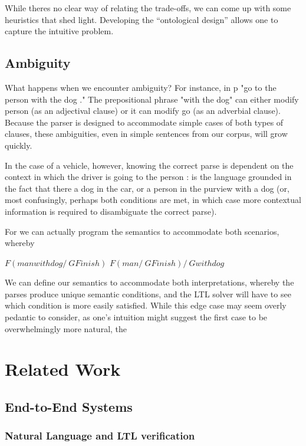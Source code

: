 \documentclass[a4paper, 11pt]{article}
\begin{document}
While theres no clear way of relating the trade-offs, we can come up with some
heuristics that shed light. Developing the ``ontological design'' allows one to
capture the intuitive problem.


\subsection{Ambiguity}

What happens when we encounter ambiguity? For instance, in p "go to the person
with the dog ." The prepositional phrase "with the dog" can either modify person
(as an adjectival clause) or it can modify go (as an adverbial clause). Because
the parser is designed to accommodate simple cases of both types of clauses,
these ambiguities, even in simple sentences from our corpus, will grow quickly. 

In the case of a vehicle, however, knowing the correct parse is dependent on
the context in which the driver is going to the person : is the language
grounded in the fact that there a dog in the car, or a person in the purview
with a dog (or, most confusingly, perhaps both conditions are met, in which case
more contextual information is required to disambiguate the correct parse).

For we can actually program the semantics to accommodate both scenarios, whereby

$F (manwithdog /\ G Finish)$
$F (man /\ G Finish) /\ G withdog$

We can define our semantics to accommodate both interpretations, whereby the
parses produce unique semantic conditions, and the LTL solver will have to see
which condition is more easily satisfied. While this edge case may seem overly
pedantic to consider, as one's intuition might suggest the first case to be
overwhelmingly more natural, the


\section{Related Work}

\subsection{End-to-End Systems}

\subsubsection{Natural Language and LTL verification}
\end{document}

